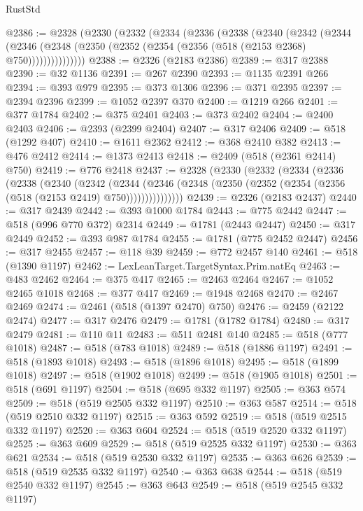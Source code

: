 \begin{lexlean}{RustStd}
\begin{coremodule}
{\begin{coremodule}
{{{{{{{{{{{{{{{{{{{{{{{{{{{{{{{{{{{{{{{{{{{{{{{{{{@2386 := @2328
    (@2330
      (@2332
        (@2334
          (@2336
            (@2338
              (@2340
                (@2342
                  (@2344
                    (@2346
                      (@2348 (@2350 (@2352 (@2354 (@2356 (@518 (@2153 @2368) @750)))))))))))))))
@2388 := @2326 (@2183 @2386)
@2389 := @317 @2388
@2390 := @32 @1136
@2391 := @267 @2390
@2393 := @1135 @2391 @266
@2394 := @393 @979
@2395 := @373 @1306
@2396 := @371 @2395
@2397 := @2394 @2396
@2399 := @1052 @2397 @370
@2400 := @1219 @266
@2401 := @377 @1784
@2402 := @375 @2401
@2403 := @373 @2402
@2404 := @2400 @2403
@2406 := @2393 (@2399 @2404)
@2407 := @317 @2406
@2409 := @518 (@1292 @407)
@2410 := @1611 @2362
@2412 := @368 @2410 @382
@2413 := @476 @2412
@2414 := @1373 @2413
@2418 := @2409 (@518 (@2361 @2414) @750)
@2419 := @776 @2418
@2437 := @2328
    (@2330
      (@2332
        (@2334
          (@2336
            (@2338
              (@2340
                (@2342
                  (@2344
                    (@2346
                      (@2348 (@2350 (@2352 (@2354 (@2356 (@518 (@2153 @2419) @750)))))))))))))))
@2439 := @2326 (@2183 @2437)
@2440 := @317 @2439
@2442 := @393 @1000 @1784
@2443 := @775 @2442
@2447 := @518 (@996 @770 @372) @2314
@2449 := @1781 (@2443 @2447)
@2450 := @317 @2449
@2452 := @393 @987 @1784
@2455 := @1781 (@775 @2452 @2447)
@2456 := @317 @2455
@2457 := @118 @39
@2459 := @772 @2457 @140
@2461 := @518 (@1390 @1197)
@2462 := LexLeanTarget.TargetSyntax.Prim.natEq
@2463 := @483 @2462
@2464 := @375 @417
@2465 := @2463 @2464
@2467 := @1052 @2465 @1018
@2468 := @377 @417
@2469 := @1948 @2468
@2470 := @2467 @2469
@2474 := @2461 (@518 (@1397 @2470) @750)
@2476 := @2459 (@2122 @2474)
@2477 := @317 @2476
@2479 := @1781 (@1782 @1784)
@2480 := @317 @2479
@2481 := @110 @11
@2483 := @511 @2481 @140
@2485 := @518 (@777 @1018)
@2487 := @518 (@783 @1018)
@2489 := @518 (@1886 @1197)
@2491 := @518 (@1893 @1018)
@2493 := @518 (@1896 @1018)
@2495 := @518 (@1899 @1018)
@2497 := @518 (@1902 @1018)
@2499 := @518 (@1905 @1018)
@2501 := @518 (@691 @1197)
@2504 := @518 (@695 @332 @1197)
@2505 := @363 @574
@2509 := @518 (@519 @2505 @332 @1197)
@2510 := @363 @587
@2514 := @518 (@519 @2510 @332 @1197)
@2515 := @363 @592
@2519 := @518 (@519 @2515 @332 @1197)
@2520 := @363 @604
@2524 := @518 (@519 @2520 @332 @1197)
@2525 := @363 @609
@2529 := @518 (@519 @2525 @332 @1197)
@2530 := @363 @621
@2534 := @518 (@519 @2530 @332 @1197)
@2535 := @363 @626
@2539 := @518 (@519 @2535 @332 @1197)
@2540 := @363 @638
@2544 := @518 (@519 @2540 @332 @1197)
@2545 := @363 @643
@2549 := @518 (@519 @2545 @332 @1197)
}}}}}}}}}}}}}}}}}}}}}}}}}}}}}}}}}}}}}}}}}}}}}}}}}}
\end{coremodule}}
\end{coremodule}
\end{lexlean}
